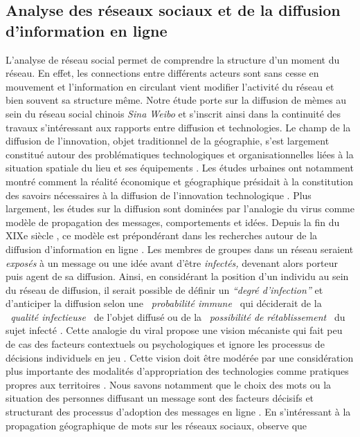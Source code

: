 \subsection[Analyse de réseaux sociaux et de la diffusion d'information en ligne]{Analyse des réseaux sociaux et de la diffusion d'information en ligne}

L{\textquoteright}analyse de réseau social permet de comprendre la structure d{\textquoteright}un moment du réseau. En effet, les connections entre différents acteurs sont sans cesse en mouvement et l{\textquoteright}information en circulant vient modifier l{\textquoteright}activité du réseau et bien souvent sa structure m\^eme. Notre étude porte sur la diffusion de mèmes au sein du réseau social chinois \textit{Sina Weibo} et s{\textquoteright}inscrit ainsi dans la continuité des travaux s{\textquoteright}intéressant aux rapports entre diffusion et technologies. Le champ de la diffusion de l{\textquoteright}innovation, objet traditionnel de la géographie, s{\textquoteright}est largement constitué autour des problématiques technologiques et organisationnelles liées à la situation spatiale du lieu et ses équipements \citep{Crevoisier2004}. Les études urbaines ont notamment montré comment la réalité économique et géographique présidait à la constitution des savoirs nécessaires à la diffusion de l{\textquoteright}innovation technologique \citep{Howells2002}. Plus largement, les études sur la diffusion sont dominées par l{\textquoteright}analogie du virus comme modèle de propagation des messages, comportements et idées. Depuis la fin du XIXe siècle \citep{LeBon1895}, ce modèle est prépondérant dans les recherches autour de la diffusion d{\textquoteright}information en ligne \citep{Goel2012}. Les membres de groupes dans un réseau seraient \textit{exposés }à un message ou une idée avant d{\textquoteright}\^etre \textit{infectés, }devenant alors porteur puis agent de sa diffusion. Ainsi, en considérant la position d{\textquoteright}un individu au sein du réseau de diffusion, il serait possible de définir un \textit{{\textquotedblleft}}\textit{degré d{\textquoteright}infection{\textquotedblright}} \citep{Cheng2013} et d{\textquoteright}anticiper la diffusion selon une \textit{{\guillemotleft}~probabilité immune~{\guillemotright} }qui\textit{ }déciderait de la \textit{{\guillemotleft}~qualité infectieuse~{\guillemotright} }de l{\textquoteright}objet diffusé ou de la \textit{{\guillemotleft}~possibilité de }\textit{rétablissement~{\guillemotright} }du sujet infecté \citep{Wang2011}. Cette analogie du viral propose une vision mécaniste qui fait peu de cas des facteurs contextuels ou psychologiques et ignore les processus de décisions individuels en jeu \citep{Jackson2010}. Cette vision doit \^etre modérée par une considération plus importante des modalités d{\textquoteright}appropriation des technologies comme pratiques propres aux territoires \citep{Fernandez2010}. Nous savons notamment que le choix des mots ou la situation des personnes diffusant un message sont des facteurs décisifs et structurant des processus d{\textquoteright}adoption des messages en ligne \citep{Conover2013}.  En s{\textquoteright}intéressant à la propagation géographique de mots sur les réseaux sociaux, \cite{Eisenstein2012} observe que 